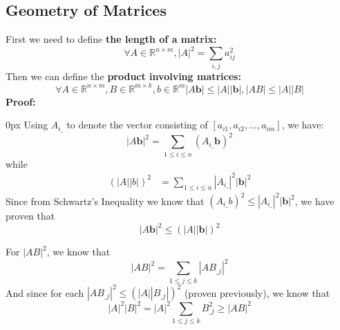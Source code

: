 \documentclass{article}
\begin{document}
\subsection{Geometry of Matrices}
First we need to define \textbf{the length of a matrix:}
\begin{equation*}
    \forall A \in \mathbb{R}^{n\times m}, |A|^2 = \sum_{i,j} a_{ij}^2 \tag{1.4.10}
\end{equation*}
Then we can define the \textbf{product involving matrices:}
\begin{equation*}
    \forall A \in \mathbb{R}^{n\times m}, B \in \mathbb{R}^{m\times k}, b \in \mathbb{R}^m |A\mathbf{b}| \leq |A| |\mathbf{b}|, |AB| \leq |A| |B| \tag{1.4.11}
\end{equation*}
\textbf{Proof:}
\begin{addmargin}[10px]{0px}
    Using $A_{i\_}$ to denote the vector consisting of $[a_{i1}, a_{i2}, ..., a_{im}]$, we have:
    \begin{equation*}
        |A\mathbf{b}|^2 = \sum_{1\leq i \leq n} (A_{i\_}\mathbf{b})^2
    \end{equation*}
    while
    \begin{equation*}
        \begin{split}
            (|A||b|)^2 &= \sum_{1\leq i\leq n} |A_{i\_}|^2 |\mathbf{b}|^2
        \end{split}
    \end{equation*}
    Since from Schwartz's Inequality we know that $(A_{i\_}b)^2 \leq |A_{i\_}|^2|\mathbf{b}|^2$, we have proven that
    \begin{equation*}
        |A\mathbf{b}|^2 \leq (|A||\mathbf{b}|)^2
    \end{equation*}
\end{addmargin}
For $|AB|^2$, we know that
\begin{equation*}
    |AB|^2 = \sum_{1\leq j\leq k} |AB_{\_j}|^2
\end{equation*}        
And since for each $|AB_{\_j}|^2 \leq (|A||B_{\_j}|)^2$ (proven previously), we know that
\begin{equation*}
    |A|^2 |B|^2 = |A|^2 \sum_{1\leq j\leq k} B_{\_j}^2 \geq |AB|^2
\end{equation*}
\end{document}
